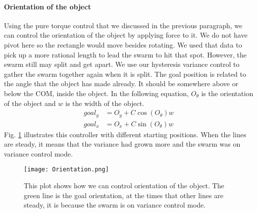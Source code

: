 \paragraph{Orientation of the object}
Using the pure torque control that we discussed in the previous paragraph, we can control the orientation of the object by applying force to it. We do not have pivot here so the rectangle would move besides rotating. We used that data to pick up a more rational length to lead the swarm to hit that spot. However, the swarm still may split and get apart. We use our hysteresis variance control to gather the swarm together again when it is split. The goal position is related to the angle that the object has made already. It should be somewhere above or below the COM, inside the object. In the following equation, $O_{\theta}$ is the orientation of the object and $w$ is the width of the object.
\begin{align}\nonumber
goal_y &= O_y + C \cos(O_{\theta})w\\
goal_x &= O_x + C \sin(O_{\theta})w
\end{align}
Fig. \ref{fig:OrientCont} illustrates this controller with different starting positions. When the lines are steady, it means that the variance had grown more and the swarm was on variance control mode.
\begin{figure}
\begin{center}
	\texttt{[image: Orientation.png]}
\end{center}
\vspace{-1em}
\caption{\label{fig:OrientCont}
This plot shows how we can control orientation of the object. The green line is the goal orientation, at the times that other lines are steady, it is because the swarm is on variance control mode.
}
\vspace{-1em}
\end{figure}


